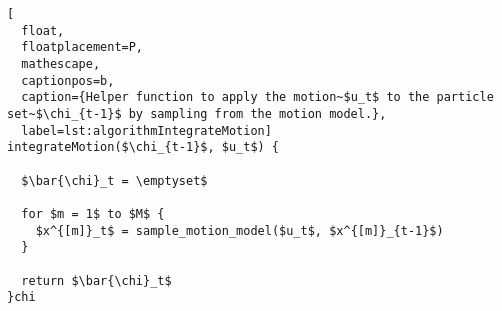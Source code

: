 \begin{lstlisting}[
  float,
  floatplacement=P,
  mathescape,
  captionpos=b,
  caption={Helper function to apply the motion~$u_t$ to the particle set~$\chi_{t-1}$ by sampling from the motion model.},
  label=lst:algorithmIntegrateMotion]
integrateMotion($\chi_{t-1}$, $u_t$) {

  $\bar{\chi}_t = \emptyset$

  for $m = 1$ to $M$ {
    $x^{[m]}_t$ = sample_motion_model($u_t$, $x^{[m]}_{t-1}$)
  }

  return $\bar{\chi}_t$
}chi\end{lstlisting}
